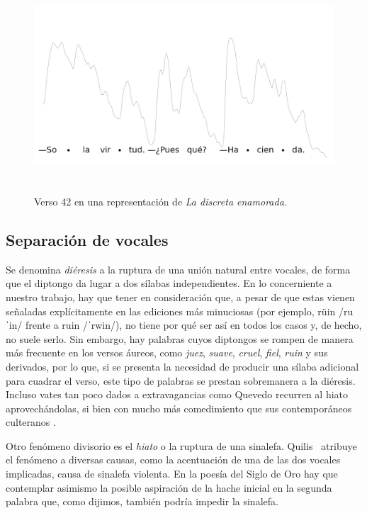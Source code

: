 \begin{figure}[!ht]
	\centering
	\includegraphics[height = 8cm]{images/solavirtud.png}    
	\caption{Verso 42 en una representación \parencite{vega1982} de \textit{La discreta enamorada}.}
	\label{fig:solavirtud}
\end{figure}

\subsection{Separación de vocales}
Se denomina \textit{diéresis} a la ruptura de  una unión natural entre vocales, de forma que el diptongo da lugar a dos sílabas independientes. En lo concerniente a nuestro trabajo, hay que tener en consideración que, a pesar de que estas vienen señaladas explícitamente en las ediciones más minuciosas (por ejemplo, \textlangle{}rüin\textrangle{} /ruˈin/ frente a \textlangle{}ruin\textrangle{} /ˈrwin/), no tiene por qué ser así en todos los casos y, de hecho, no suele serlo. Sin embargo, hay palabras cuyos diptongos se rompen de manera más frecuente en los versos áureos, como \textit{juez}, \textit{suave}, \textit{cruel}, \textit{fiel}, \textit{ruin} y sus derivados, por lo que, si se presenta la necesidad de producir una sílaba adicional para cuadrar el verso, este tipo de palabras se prestan sobremanera a la diéresis. Incluso vates tan poco dados a extravagancias como Quevedo recurren al hiato aprovechándolas, si bien con mucho más comedimiento que sus contemporáneos culteranos \parencite[55-64]{llamas2020}.

Otro fenómeno divisorio es el \textit{hiato} o la ruptura de una sinalefa. Quilis~\parencite*[50-52]{quilis2013} atribuye el fenómeno a diversas causas, como la acentuación de una de las dos vocales implicadas, causa de sinalefa violenta. En la poesía del Siglo de Oro hay que contemplar asimismo la posible aspiración de la hache inicial en la segunda palabra que, como dijimos, también podría impedir la sinalefa.


